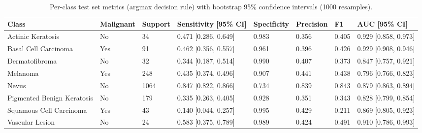 \begin{table}
\caption{Per-class test set metrics (argmax decision rule) with bootstrap 95\% confidence intervals (1000 resamples).}
\label{tab:table2_per_class_metrics}
\begin{tabular}{lllllll l}
\toprule
Class & Malignant & Support & Sensitivity [95\% CI] & Specificity & Precision & F1 & AUC [95\% CI] \\
\midrule
Actinic Keratosis & No & 34 & 0.471 [0.286, 0.649] & 0.983 & 0.356 & 0.405 & 0.929 [0.858, 0.973] \\
Basal Cell Carcinoma & Yes & 91 & 0.462 [0.356, 0.557] & 0.961 & 0.396 & 0.426 & 0.929 [0.908, 0.946] \\
Dermatofibroma & No & 32 & 0.344 [0.187, 0.514] & 0.990 & 0.407 & 0.373 & 0.847 [0.757, 0.921] \\
Melanoma & Yes & 248 & 0.435 [0.374, 0.496] & 0.907 & 0.441 & 0.438 & 0.796 [0.766, 0.823] \\
Nevus & No & 1064 & 0.847 [0.822, 0.866] & 0.734 & 0.839 & 0.843 & 0.879 [0.863, 0.894] \\
Pigmented Benign Keratosis & No & 179 & 0.335 [0.263, 0.405] & 0.928 & 0.351 & 0.343 & 0.828 [0.799, 0.854] \\
Squamous Cell Carcinoma & Yes & 43 & 0.140 [0.044, 0.257] & 0.995 & 0.429 & 0.211 & 0.869 [0.805, 0.923] \\
Vascular Lesion & No & 24 & 0.583 [0.375, 0.789] & 0.989 & 0.424 & 0.491 & 0.910 [0.786, 0.993] \\
\bottomrule
\end{tabular}
\end{table}
